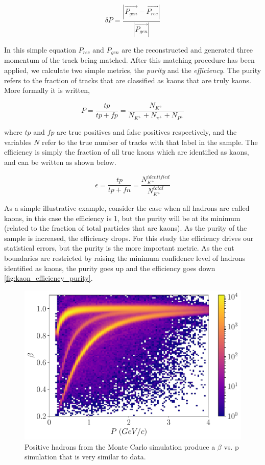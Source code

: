 \begin{equation}
	\delta P = \frac{|\vec{P_{gen}} - \vec{P_{rec}}|}{|\vec{P_{gen}}|}
\end{equation}   

In this simple equation $P_{rec}$ and $P_{gen}$ are the reconstructed and generated three momentum of the track being matched.  After this matching procedure has been applied, we calculate two simple metrics, the \textit{purity} and the \textit{efficiency}.  The purity refers to the fraction of tracks that are classified as kaons that are truly kaons.  More formally it is written, 

\begin{equation}
		P = \frac{tp}{tp + fp} = \frac{N_{K^+}}{N_{K^+} + N_{\pi^+} + N_{P^+}}
\end{equation}     

where $tp$ and $fp$ are true positives and false positives respectively, and the variables $N$ refer to the true number of tracks with that label in the sample.  The efficiency is simply the fraction of all true kaons which are identified as kaons, and can be written as shown below.   

\begin{equation}
	\epsilon = \frac{tp}{tp + fn} = \frac{N_{K^+}^{identified}}{N_{K^+}^{total}}
\end{equation}

As a simple illustrative example, consider the case when all hadrons are called kaons, in this case the efficiency is 1, but the purity will be at its minimum (related to the fraction of total particles that are kaons).  As the purity of the sample is increased, the efficiency drops.  For this study the efficiency drives our statistical errors, but the purity is the more important metric.  As the cut boundaries are restricted by raising the minimum confidence level of hadrons identified as kaons, the purity goes up and the efficiency goes down \ref{fig:kaon_efficiency_purity}.

\begin{figure}
	\centering
	\label{fig:beta_p_simulation}
	\includegraphics[width=15cm]{image/plots/hadron-id/beta_p_simulation.pdf}
	\caption{Positive hadrons from the Monte Carlo simulation produce a $\beta$  vs. p simulation that is very similar to data.}
\end{figure}

